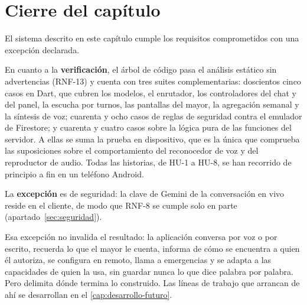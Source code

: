 \section{Cierre del capítulo}

El sistema descrito en este capítulo cumple los requisitos comprometidos con una excepción declarada.

En cuanto a la \textbf{verificación}, el árbol de código pasa el análisis estático sin advertencias (RNF-13)
y cuenta con tres suites complementarias: doscientos cinco casos en Dart, que cubren los modelos, el
enrutador, los controladores del chat y del panel, la escucha por turnos, las pantallas del mayor, la
agregación semanal y la síntesis de voz; cuarenta y ocho casos de reglas de seguridad contra el emulador de
Firestore; y cuarenta y cuatro casos sobre la lógica pura de las funciones del servidor. A ellas se suma la
prueba en dispositivo, que es la única que comprueba las suposiciones sobre el comportamiento del
reconocedor de voz y del reproductor de audio. Todas las historias, de HU-1 a HU-8, se han recorrido de
principio a fin en un teléfono Android.

La \textbf{excepción} es de seguridad: la clave de Gemini de la conversación en vivo reside en el cliente, de
modo que RNF-8 se cumple solo en parte (apartado~\ref{sec:seguridad}).

Esa excepción no invalida el resultado: la aplicación conversa por voz o por escrito, recuerda lo que el mayor
le cuenta, informa de cómo se encuentra a quien él autoriza, se configura en remoto, llama a emergencias y se
adapta a las capacidades de quien la usa, sin guardar nunca lo que dice palabra por palabra. Pero delimita
dónde termina lo construido. Las líneas de trabajo que arrancan de ahí se desarrollan en el
\autoref{cap:desarrollo-futuro}.
